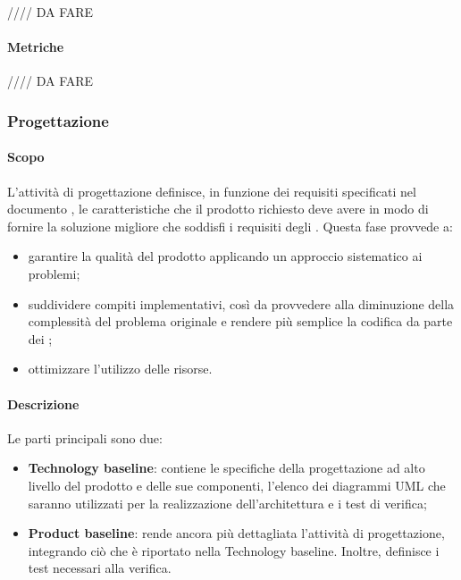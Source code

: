 //// DA FARE

\paragraph{Metriche}

//// DA FARE

\subsubsection{Progettazione}

\paragraph{Scopo}

L'attività di progettazione definisce, in funzione dei requisiti specificati nel documento \AdR{}, le caratteristiche che il prodotto richiesto deve avere in modo di fornire la soluzione migliore che soddisfi i requisiti degli .  Questa fase provvede a:
\begin{itemize}

\item garantire la qualità del prodotto applicando un approccio sistematico ai problemi;

\item suddividere compiti implementativi,  così da provvedere alla diminuzione della complessità del problema originale e rendere più semplice la codifica da parte dei \progrs{};

\item ottimizzare l'utilizzo delle risorse.

\end{itemize}

\paragraph{Descrizione}

Le parti principali sono due:
\begin{itemize}

\item \textbf{Technology baseline}: contiene le specifiche della progettazione ad alto livello del prodotto e delle sue componenti,  l'elenco dei diagrammi UML che saranno utilizzati per la realizzazione dell'architettura e i test di verifica;
\item \textbf{Product baseline}: rende ancora più dettagliata l'attività di progettazione, integrando ciò che è riportato nella Technology baseline. Inoltre, definisce i test necessari alla verifica.

\end{itemize}

